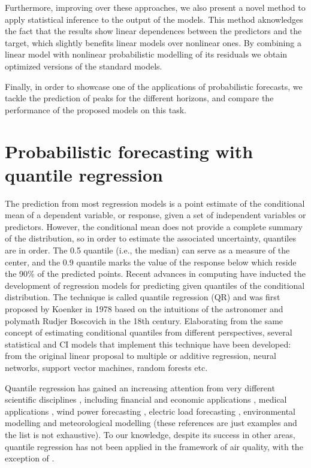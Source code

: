 \documentclass[a4paper,3p,sort&compress]{elsarticle}
\begin{document}
Furthermore, improving over these approaches, we also present a novel method to
apply statistical inference to the output of the models. This method aknowledges
the fact that the results show linear dependences between the predictors and the
target, which slightly benefits linear models over nonlinear ones. By combining
a linear model with nonlinear probabilistic modelling of its residuals we obtain
optimized versions of the standard models.

Finally, in order to showcase one of the applications of probabilistic
forecasts, we tackle the prediction of \no peaks for the different horizons, and
compare the performance of the proposed models on this task.

\section{Probabilistic forecasting with quantile regression}
\label{sec:probForec}

The prediction from most regression models is a point estimate of the
conditional mean of a dependent variable, or response, given a set of
independent variables or predictors. However, the conditional mean does not
provide a complete summary of the distribution, so in order to estimate the
associated uncertainty, quantiles are in order. The 0.5 quantile (i.e., the
median) can serve as a measure of the center, and the 0.9 quantile marks the
value of the response below which reside the 90\% of the predicted points.
Recent advances in computing have inducted the development of regression models
for predicting given quantiles of the conditional distribution. The technique is
called quantile regression (QR) and was first proposed by Koenker in 1978
\cite{koenker_regression_1978} based on the intuitions of the astronomer and
polymath Rudjer Boscovich in the 18th century. Elaborating from the same concept
of estimating conditional quantiles from different perspectives, several
statistical and CI models that implement this technique have been developed:
from the original linear proposal to multiple or additive regression, neural
networks, support vector machines, random forests etc.

Quantile regression has gained an increasing attention from very
different scientific disciplines \cite{yu_quantile_2003}, including
financial and economic applications \cite{ben_rejeb_financial_2016},
medical applications \cite{jang_quantile_2018}, wind power forecasting
\cite{wan_direct_2017}, electric load forecasting
\cite{lebotsa_short_2018}, environmental modelling
\cite{cade_gentle_2003} and meteorological modelling
\cite{baur_modelling_2004} (these references are just examples and the
list is not exhaustive). To our knowledge, despite its success in
other areas, quantile regression has not been applied in the framework
of air quality, with the exception of
\cite{martinezsilva_forecasting_2016}.
\end{document}
